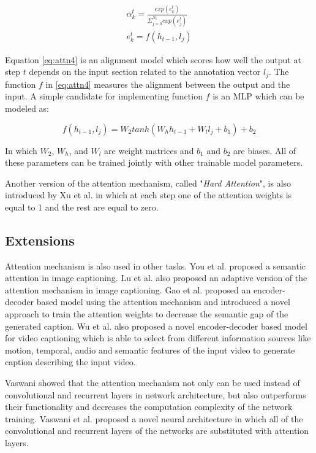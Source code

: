 \documentclass[preprint, 12pt]{elsarticle}
\begin{document}
		\begin{align}
			\alpha_k^t = \frac{exp(e_k^t)}{\Sigma_{j=0}^{N_i} exp(e_j^t)} \label{eq:attn3}\\
			e_k^t = f(h_{t-1}, l_j) \label{eq:attn4}
		\end{align}
		
		Equation \eqref{eq:attn4} is an alignment model which scores how well the output at step $t$ depends on the input section related to the annotation vector $l_j$. The function $f$ in \eqref{eq:attn4} measures the alignment between the output and the input. A simple candidate for implementing function $f$ is an MLP which can be modeled as:
		
		\begin{equation}
			f(h_{t-1}, l_j) = W_2 tanh(W_h h_{t-1} + W_l l_{j} + b_1) + b_2
		\end{equation}
		
		In which $W_2$, $W_h$, and $W_l$ are weight matrices and $b_1$ and $b_2$ are biases. All of these parameters can be trained jointly with other trainable model parameters.
		
		Another version of the attention mechanism, called "\textit{Hard Attention}", is also introduced by Xu et al. \cite{xu2015show} in which at each step one of the attention weights is equal to 1 and the rest are equal to zero. 
		
		\subsection{Extensions}
		Attention mechanism is also used in other tasks. You et al. \cite{you2016image} proposed a semantic attention in image captioning. Lu et al. \cite{lu2017knowing} also proposed an adaptive version of the attention mechanism in image captioning. Gao et al. proposed an encoder-decoder based model using the attention mechanism and introduced a novel approach to train the attention weights to decrease the semantic gap of the generated caption. Wu et al. \cite{wu2018hierarchical} also proposed a novel encoder-decoder based model for video captioning which is able to select from different information sources like motion, temporal, audio and semantic features of the input video to generate caption describing the input video.
		
		Vaswani \cite{vaswani2017attention} showed that the attention mechanism not only can be used instead of convolutional and recurrent layers in network architecture, but also outperforms their functionality and decreases the computation complexity of the network training. Vaswani et al. \cite{vaswani2017attention} proposed a novel neural architecture in which all of the convolutional and recurrent layers of the networks are substituted with attention layers.
		
\end{document}
